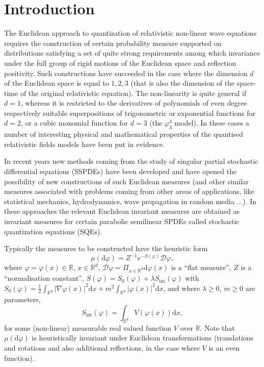 \documentclass[a4paper,10pt]{article}
\newcommand{\mathd}{\mathrm{d}}
\newcommand{\tmop}[1]{\ensuremath{\operatorname{#1}}}
\newcommand{\textdots}[0]{...}
\begin{document}
{\tableofcontents}

\section{Introduction}

The Euclidean approach to quantization of relativistic non-linear wave
equations requires the construction of certain probability measure supported
on distributions satisfying a set of quite strong requirements among which
invariance under the full group of rigid motions of the Euclidean space and
reflection positivity. Such constructions have succeeded in the case where the
dimension $d$ of the Euclidean space is equal to $1, 2, 3$ (that is also the
dimension of the space-time of the original relativistic equation). The
non-linearity is quite general if $d = 1$, whereas it is restricted to the
derivatives of polynomials of even degree respectively suitable superpositions
of trigonometric or exponential functions for $d = 2$, or a cubic monomial
function for $d = 3$ (the $\varphi^4_3$ model). In these cases a number of
interesting physical and mathematical properties of the quantised relativistic
fields models have been put in evidence.

In recent years new methods coming from the study of singular partial
stochastic differential equations (SSPDEs) have been developed and have opened
the possibility of new constructions of such Euclidean measures (and other
similar measures associated with problems coming from other areas of
applications, like statistical mechanics, hydrodynamics, wave propagation in
random media {\textdots}). In these approaches the relevant Euclidean
invariant measures are obtained as invariant measures for certain parabolic
semilinear SPDEs called stochastic quantization equations (SQEs).

Typically the measures to be constructed have the heuristic form
\[ \mu (\mathd \varphi) = Z^{- 1} e^{- S (\varphi)} \mathcal{D} \varphi, \]
where $\varphi = \varphi (x) \in \mathbb{R}$, $x \in \mathbb{R}^d$,
$\mathcal{D} \varphi = \Pi_{x \in \mathbb{R}^d} \mathd \varphi (x)$ is a
``flat measure'', $Z$ is a ``normalisation constant'', $S (\varphi) = S_0
(\varphi) + \lambda S_{\tmop{int}} (\varphi)$ with $S_0 (\varphi) =
\frac{1}{2} \int_{\mathbb{R}^d} | \nabla \varphi (x) |^2 \mathd x + m^2
\int_{\mathbb{R}^d} | \varphi (x) |^2 \mathd x$, and where $\lambda \geqslant
0$, $m \geqslant 0$ are parameters,
\[ S_{\tmop{int}} (\varphi) = \int_{\mathbb{R}^d} V (\varphi (x)) \mathd x, \]
for some (non-linear) measurable real valued function $V$ over $\mathbb{R}$.
Note that $\mu (\mathd \varphi)$ is heuristically invariant under Euclidean
transformations (translations and rotations and also additional reflections,
in the case where $V$ is an even function).
\end{document}
